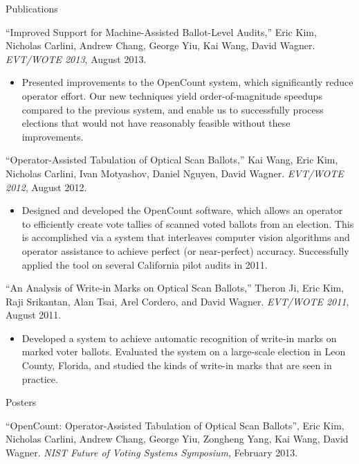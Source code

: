 \documentclass{resume}
\begin{document}
\begin{component}{Publications}
  
\vspace{0.5em}
``Improved Support for Machine-Assisted Ballot-Level Audits,'' Eric Kim, Nicholas Carlini, Andrew Chang, George Yiu, Kai Wang, David Wagner. \emph{EVT/WOTE 2013}, August 2013.
    \begin{itemize}
        \vspace{-0.5em}\item[] Presented improvements to the OpenCount system,
        which significantly reduce operator effort.
        Our new techniques yield order-of-magnitude speedups compared
        to the previous system, and enable us to successfully process
        elections that would not have reasonably feasible without these
        improvements.
    \end{itemize}
    
``Operator-Assisted Tabulation of Optical Scan Ballots,'' Kai Wang, Eric Kim, Nicholas Carlini, Ivan Motyashov, Daniel Nguyen, David Wagner. \emph{EVT/WOTE 2012}, August 2012.
        \begin{itemize}
        \vspace{-0.5em}\item[] Designed and developed the OpenCount software, which allows an operator
to efficiently create vote tallies of scanned voted ballots from an election. This is accomplished via a system 
that interleaves computer vision algorithms and operator assistance to achieve perfect (or near-perfect) accuracy.
Successfully applied the tool on several California pilot audits in 2011. 
        \end{itemize}

``An Analysis of Write-in Marks on Optical Scan Ballots,'' Theron Ji, Eric Kim, Raji Srikantan, Alan Tsai, Arel Cordero, and David Wagner. \emph{EVT/WOTE 2011}, August 2011.
	\begin{itemize}
	\vspace{-0.5em}\item[] Developed a system to achieve automatic recognition of write-in marks on marked voter ballots. Evaluated the system on
				       a large-scale election in Leon County, Florida, and studied the kinds of write-in marks that are seen in practice.
	\end{itemize}
\end{component}

\vspace{-0.5em}

\begin{component}{Posters}

``OpenCount: Operator-Assisted Tabulation of Optical Scan Ballots'', Eric Kim, Nicholas Carlini, Andrew Chang, George Yiu, Zongheng Yang, Kai Wang, David Wagner. \emph{NIST Future of Voting Systems Symposium}, February 2013. 
\end{component}
\end{document}
